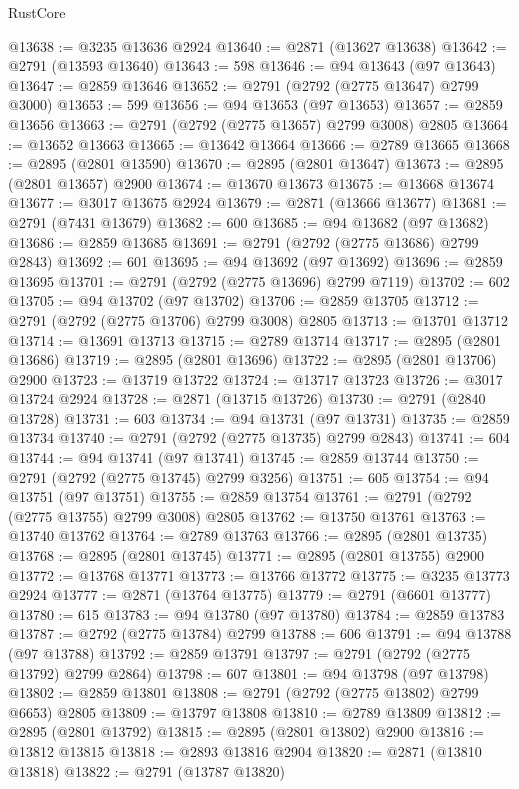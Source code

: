\begin{lexlean}{RustCore}
\begin{coremodule}
@13638 := @3235 @13636 @2924
@13640 := @2871 (@13627 @13638)
@13642 := @2791 (@13593 @13640)
@13643 := 598
@13646 := @94 @13643 (@97 @13643)
@13647 := @2859 @13646
@13652 := @2791 (@2792 (@2775 @13647) @2799 @3000)
@13653 := 599
@13656 := @94 @13653 (@97 @13653)
@13657 := @2859 @13656
@13663 := @2791 (@2792 (@2775 @13657) @2799 @3008) @2805
@13664 := @13652 @13663
@13665 := @13642 @13664
@13666 := @2789 @13665
@13668 := @2895 (@2801 @13590)
@13670 := @2895 (@2801 @13647)
@13673 := @2895 (@2801 @13657) @2900
@13674 := @13670 @13673
@13675 := @13668 @13674
@13677 := @3017 @13675 @2924
@13679 := @2871 (@13666 @13677)
@13681 := @2791 (@7431 @13679)
@13682 := 600
@13685 := @94 @13682 (@97 @13682)
@13686 := @2859 @13685
@13691 := @2791 (@2792 (@2775 @13686) @2799 @2843)
@13692 := 601
@13695 := @94 @13692 (@97 @13692)
@13696 := @2859 @13695
@13701 := @2791 (@2792 (@2775 @13696) @2799 @7119)
@13702 := 602
@13705 := @94 @13702 (@97 @13702)
@13706 := @2859 @13705
@13712 := @2791 (@2792 (@2775 @13706) @2799 @3008) @2805
@13713 := @13701 @13712
@13714 := @13691 @13713
@13715 := @2789 @13714
@13717 := @2895 (@2801 @13686)
@13719 := @2895 (@2801 @13696)
@13722 := @2895 (@2801 @13706) @2900
@13723 := @13719 @13722
@13724 := @13717 @13723
@13726 := @3017 @13724 @2924
@13728 := @2871 (@13715 @13726)
@13730 := @2791 (@2840 @13728)
@13731 := 603
@13734 := @94 @13731 (@97 @13731)
@13735 := @2859 @13734
@13740 := @2791 (@2792 (@2775 @13735) @2799 @2843)
@13741 := 604
@13744 := @94 @13741 (@97 @13741)
@13745 := @2859 @13744
@13750 := @2791 (@2792 (@2775 @13745) @2799 @3256)
@13751 := 605
@13754 := @94 @13751 (@97 @13751)
@13755 := @2859 @13754
@13761 := @2791 (@2792 (@2775 @13755) @2799 @3008) @2805
@13762 := @13750 @13761
@13763 := @13740 @13762
@13764 := @2789 @13763
@13766 := @2895 (@2801 @13735)
@13768 := @2895 (@2801 @13745)
@13771 := @2895 (@2801 @13755) @2900
@13772 := @13768 @13771
@13773 := @13766 @13772
@13775 := @3235 @13773 @2924
@13777 := @2871 (@13764 @13775)
@13779 := @2791 (@6601 @13777)
@13780 := 615
@13783 := @94 @13780 (@97 @13780)
@13784 := @2859 @13783
@13787 := @2792 (@2775 @13784) @2799
@13788 := 606
@13791 := @94 @13788 (@97 @13788)
@13792 := @2859 @13791
@13797 := @2791 (@2792 (@2775 @13792) @2799 @2864)
@13798 := 607
@13801 := @94 @13798 (@97 @13798)
@13802 := @2859 @13801
@13808 := @2791 (@2792 (@2775 @13802) @2799 @6653) @2805
@13809 := @13797 @13808
@13810 := @2789 @13809
@13812 := @2895 (@2801 @13792)
@13815 := @2895 (@2801 @13802) @2900
@13816 := @13812 @13815
@13818 := @2893 @13816 @2904
@13820 := @2871 (@13810 @13818)
@13822 := @2791 (@13787 @13820)

\end{coremodule}
\end{lexlean}
